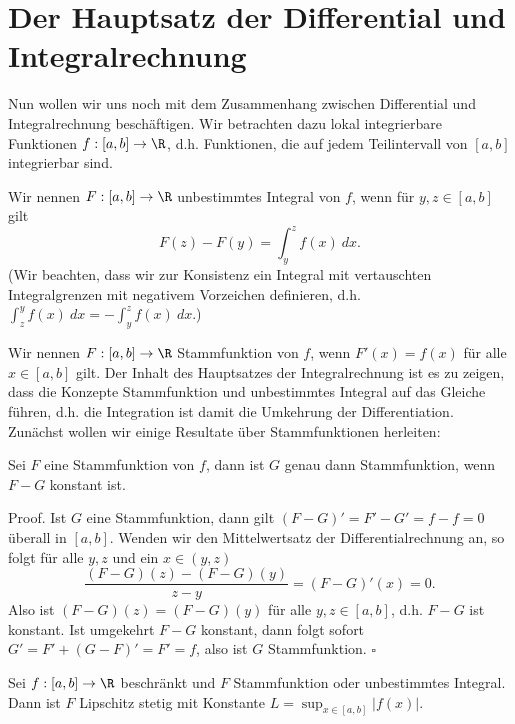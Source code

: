 \documentclass[letterpaper,10pt,english]{jupyterBook}
\begin{document}
\section{Der Hauptsatz der Differential  und Integralrechnung}
\label{\detokenize{integration/hdi:der-hauptsatz-der-differential-und-integralrechnung}}\label{\detokenize{integration/hdi::doc}}
Nun wollen wir uns noch mit dem Zusammenhang zwischen Differential  und Integralrechnung beschäftigen. Wir betrachten dazu lokal integrierbare Funktionen \(f:[a,b] \rightarrow \R\), d.h. Funktionen, die auf jedem Teilintervall von \([a,b]\) integrierbar sind.

Wir nennen \(F:[a,b] \rightarrow \R\) unbestimmtes Integral von \(f\), wenn für \(y,z \in [a,b]\) gilt
\begin{equation*}
 F(z) - F(y) = \int_y^z f(x)~dx.
\end{equation*}
(Wir beachten, dass wir zur Konsistenz ein Integral mit vertauschten Integralgrenzen mit negativem Vorzeichen definieren, d.h.
\(\int_z^y f(x)~dx = - \int_y^z f(x)~dx. \))

Wir nennen \(F:[a,b] \rightarrow \R\) Stammfunktion von \(f\), wenn \(F'(x)=f(x)\) für alle \(x \in [a,b]\) gilt. Der Inhalt des Hauptsatzes der Integralrechnung ist es zu zeigen, dass die Konzepte Stammfunktion und unbestimmtes Integral auf das Gleiche führen, d.h. die Integration ist damit die Umkehrung der Differentiation.
Zunächst wollen wir einige Resultate über Stammfunktionen herleiten:
\label{integration/hdi:lemma-0}
\begin{lemma}{}{}



Sei \(F\) eine Stammfunktion von \(f\), dann ist \(G\) genau dann Stammfunktion, wenn \(F-G\) konstant ist.
\end{lemma}

\begin{emphBox}{}{}
Proof. Ist \(G\) eine Stammfunktion, dann gilt \((F-G)'=F'-G'= f-f=0\) überall in \([a,b]\). Wenden wir den Mittelwertsatz der Differentialrechnung an, so folgt für alle \(y,z\) und ein \(x \in (y,z)\)
\begin{equation*}
 \frac{(F-G)(z) - (F-G)(y)}{z-y} = (F-G)'(x) = 0.
\end{equation*}
Also ist \((F-G)(z) = (F-G)(y)\) für alle \(y,z \in  [a,b]\), d.h. \(F-G\) ist konstant.
Ist umgekehrt \(F-G\) konstant, dann folgt sofort \(G' = F' + (G-F)' = F'=f\), also ist \(G\) Stammfunktion. \(\square\)
\end{emphBox}
\label{integration/hdi:lemma-1}
\begin{lemma}{}{}



Sei \(f:[a,b]\rightarrow \R\) beschränkt und \(F\) Stammfunktion oder unbestimmtes Integral. Dann ist \(F\) Lipschitz stetig mit Konstante \(L=\sup_{x \in [a,b]} \vert f(x) \vert. \)
\end{lemma}
\end{document}
